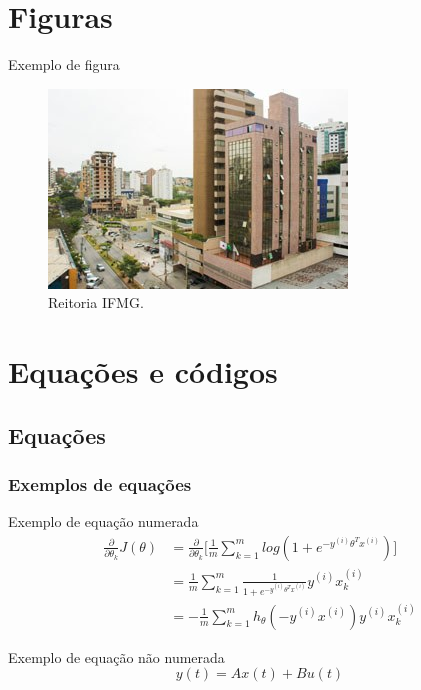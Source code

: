 \documentclass[table,xcolor=table]{apresentacoes/exemplo-2/IFMG-beamer}
\begin{document}
\section{Figuras}

\begin{frame}{Exemplo de figura} 

\begin{figure}
\centering
\caption{Reitoria IFMG.}
\includegraphics[width=0.8\linewidth]{figs/reitoria.jpeg}

\end{figure}

\end{frame}

\section{Equações e códigos}
\subsection{Equações}


\begin{frame}
\frametitle{Exemplos de equações}


    \begin{block}{Exemplo de equação numerada}
        \begin{align}
            \frac{\partial}{\partial \theta_k}J(\theta) 
                &= \frac{\partial}{\partial \theta_k}\Bigg[\frac{1}{m}\sum_{k=1}^m log(1+e^{-y^{(i)}\theta^Tx^{(i)}})\Bigg] \\
                &= \frac{1}{m}\sum_{k=1}^m \frac{1}{1+e^{-y^{(i)}\theta^Tx^{(i)}}}y^{(i)}x_k^{(i)} \\
                &= -\frac{1}{m}\sum_{k=1}^m h_\theta(-y^{(i)}x^{(i)})y^{(i)}x_k^{(i)}        
        \end{align}
    \end{block}
    
\begin{block}{Exemplo de equação não numerada}
    \begin{equation*}
        y(t) = Ax(t) + Bu(t)
    \end{equation*}
\end{block}

\end{frame}
\end{document}
